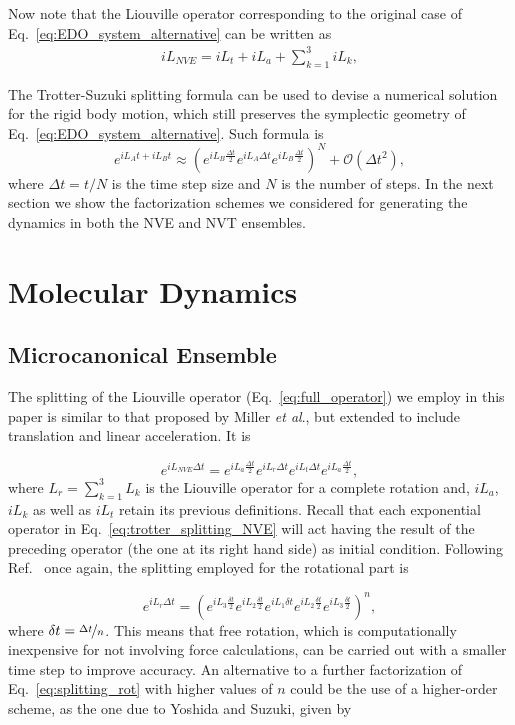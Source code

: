 \documentclass[aip,jcp,reprint,amsmath,amssymb]{revtex4-1}
\begin{document}
Now note that the Liouville operator corresponding to the original case of Eq.~\ref{eq:EDO_system_alternative} can be written as
\begin{align}
\label{eq:full_operator}
i L_{NVE} = i L_t + i L_a + \sum_{k=1}^3 i L_k,
\end{align}

The Trotter-Suzuki splitting formula\cite{Trotter1959, Suzuki1976} can be used to devise a numerical solution for the rigid body motion, which still preserves the symplectic geometry of Eq.~\ref{eq:EDO_system_alternative}. Such formula is
\[
e^{i L_A t + i L_B t} \approx \left( e^{i L_B \frac{\Delta t}{2}} e^{i L_A \Delta t} e^{i L_B \frac{\Delta t}{2}} \right)^N + \mathcal{O}(\Delta t^2),
\]
where $\Delta t = t/N$ is the time step size and $N$ is the number of steps. In the next section we show the factorization schemes we considered for generating the dynamics in both the NVE and NVT ensembles.

\section{Molecular Dynamics}
\label{sec:moleculardynamics}

\subsection{Microcanonical Ensemble}

The splitting of the Liouville operator (Eq.~\ref{eq:full_operator}) we employ in this paper is similar to that proposed by Miller \textit{et al}.\cite{Miller2002}, but extended to include translation and linear acceleration. It is

\begin{equation}
\label{eq:trotter_splitting_NVE}
e^{i L_{NVE} \Delta t} = e^{i L_a \frac{\Delta t}{2}} e^{i L_r \Delta t} e^{i L_t \Delta t} e^{i L_a \frac{\Delta t}{2}},
\end{equation}
where $L_r = \sum_{k=1}^3 L_k$ is the Liouville operator for a complete rotation and, $i L_a $, $i L_k $ as well as $i L_t $ retain its previous definitions. Recall that each exponential operator in Eq.~\ref{eq:trotter_splitting_NVE} will act having the result of the preceding operator (the one at its right hand side) as initial condition. Following Ref.~ once again, the splitting employed for the rotational part is\cite{Tuckerman1992}

\begin{equation}
\label{eq:splitting_rot}
e^{i L_r \Delta t} = \left( e^{i L_3 \frac{\delta t}{2}} e^{i L_2 \frac{\delta t}{2}} e^{i L_1 \delta t} e^{i L_2 \frac{\delta t}{2}} e^{i L_3 \frac{\delta t}{2}} \right)^n,
\end{equation}
where $\delta t = \nicefrac{\Delta t}{n}$. This means that free rotation, which is computationally inexpensive for not involving force calculations, can be carried out with a smaller time step to improve accuracy. An alternative to a further factorization of Eq.~\ref{eq:splitting_rot} with higher values of $n$ could be the use of a higher-order scheme, as the one due to Yoshida \cite{Yoshida1990} and Suzuki\cite{Suzuki1991a,Suzuki1991b}, given by
 
\end{document}
